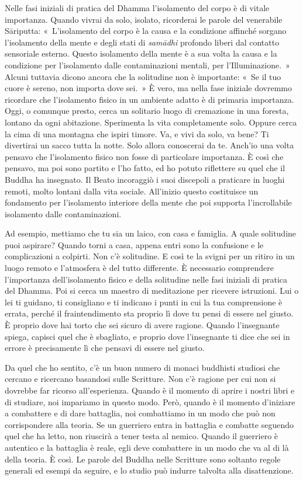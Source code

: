 Nelle fasi iniziali di pratica del Dhamma l'isolamento del corpo è di
vitale importanza. Quando vivrai da solo, isolato, ricorderai le parole
del venerabile Sāriputta: «~L'isolamento del corpo è la causa e la
condizione affinché sorgano l'isolamento della mente e degli stati di
\emph{samādhi} profondo liberi dal contatto sensoriale esterno. Questo
isolamento della mente è a sua volta la causa e la condizione per
l'isolamento dalle contaminazioni mentali, per l'Illuminazione.~» Alcuni
tuttavia dicono ancora che la solitudine non è importante: «~Se il tuo
cuore è sereno, non importa dove sei.~» È vero, ma nella fase iniziale
dovremmo ricordare che l'isolamento fisico in un ambiente adatto è di
primaria importanza. Oggi, o comunque presto, cerca un solitario luogo
di cremazione in una foresta, lontano da ogni abitazione. Sperimenta la
vita completamente solo. Oppure cerca la cima di una montagna che ispiri
timore. Va, e vivi da solo, va bene? Ti divertirai un sacco tutta la
notte. Solo allora conoscerai da te. Anch'io una volta pensavo che
l'isolamento fisico non fosse di particolare importanza. È così che
pensavo, ma poi sono partito e l'ho fatto, ed ho potuto riflettere su
quel che il Buddha ha insegnato. Il Beato incoraggiò i suoi discepoli a
praticare in luoghi remoti, molto lontani dalla vita sociale. All'inizio
questo costituisce un fondamento per l'isolamento interiore della mente
che poi supporta l'incrollabile isolamento dalle contaminazioni.

Ad esempio, mettiamo che tu sia un laico, con casa e famiglia. A quale
solitudine puoi aspirare? Quando torni a casa, appena entri sono la
confusione e le complicazioni a colpirti. Non c'è solitudine. E così te
la svigni per un ritiro in un luogo remoto e l'atmosfera è del tutto
differente. È necessario comprendere l'importanza dell'isolamento
fisico e della solitudine nelle fasi iniziali di pratica del Dhamma. Poi
si cerca un maestro di meditazione per ricevere istruzioni. Lui o lei ti
guidano, ti consigliano e ti indicano i punti in cui la tua comprensione
è errata, perché il fraintendimento sta proprio lì dove tu pensi di
essere nel giusto. È proprio dove hai torto che sei sicuro di avere
ragione. Quando l'insegnante spiega, capisci quel che è sbagliato, e
proprio dove l'insegnante ti dice che sei in errore è precisamente lì
che pensavi di essere nel giusto.

Da quel che ho sentito, c'è un buon numero di monaci buddhisti studiosi
che cercano e ricercano basandosi sulle Scritture. Non c'è ragione per
cui non si dovrebbe far ricorso all'esperienza. Quando è il momento di
aprire i nostri libri e di studiare, noi impariamo in questo modo. Però,
quando è il momento d'iniziare a combattere e di dare battaglia, noi
combattiamo in un modo che può non corrispondere alla teoria. Se un
guerriero entra in battaglia e combatte seguendo quel che ha letto, non
riuscirà a tener testa al nemico. Quando il guerriero è autentico e la
battaglia è reale, egli deve combattere in un modo che va al di là della
teoria. È così. Le parole del Buddha nelle Scritture sono soltanto
regole generali ed esempi da seguire, e lo studio può indurre talvolta
alla disattenzione.

